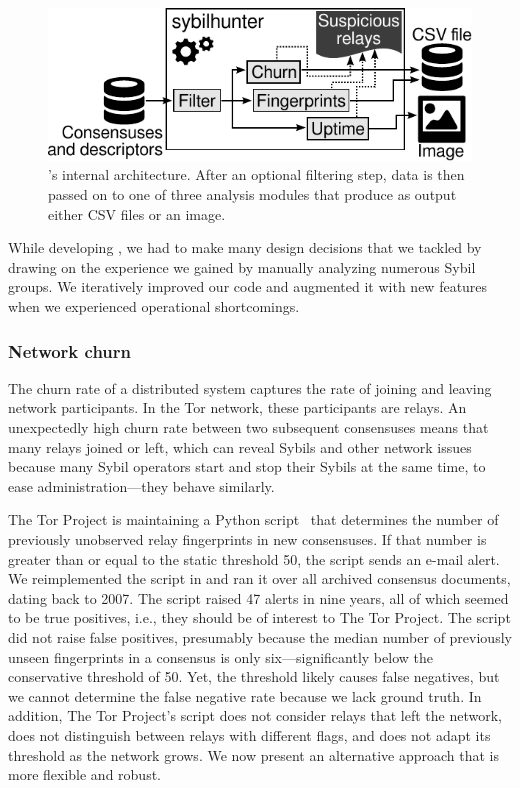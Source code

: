 \begin{figure}[t]
	\centering
	\includegraphics[width=0.9\linewidth]{diagrams/internal-architecture.pdf}
	\caption{\Sys's internal architecture.  After an optional filtering step,
	data is then passed on to one of three analysis modules that produce as
	output either CSV files or an image.}
	\label{fig:shr-internal}
\end{figure}

While developing \sys, we had to make many design decisions that we tackled by
drawing on the experience we gained by manually analyzing numerous Sybil
groups.  We iteratively improved our code and augmented it with new features
when we experienced operational shortcomings.

\subsubsection{Network churn}
\label{sec:churn-time-series}
The churn rate of a distributed system captures the rate of joining and leaving
network participants.  In the Tor network, these participants are relays.  An
unexpectedly high churn rate between two subsequent consensuses means that many
relays joined or left, which can reveal Sybils and other network issues because
many Sybil operators start and stop their Sybils at the same time, to ease
administration---they behave similarly.

The Tor Project is maintaining a Python script~\cite{doctor} that determines the
number of previously unobserved relay fingerprints in new consensuses.  If that
number is greater than or equal to the static threshold 50, the script sends an
e-mail alert.  We reimplemented the script in \sys and ran it over all archived
consensus documents, dating back to 2007.  The script raised 47 alerts in nine
years, all of which seemed to be true positives, i.e., they should be of
interest to The Tor Project.  The script did not raise false positives,
presumably because the median number of previously unseen fingerprints in a
consensus is only six---significantly below the conservative threshold of 50.
Yet, the threshold likely causes false negatives, but we cannot determine the
false negative rate because we lack ground truth.  In addition, The Tor
Project's script does not consider relays that left the network, does not
distinguish between relays with different flags, and does not adapt its
threshold as the network grows.  We now present an alternative approach that is
more flexible and robust.

